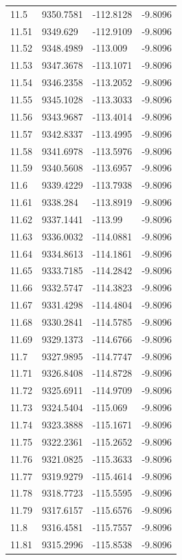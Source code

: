 \begin{table}[H]
\begin{tabular}{llll}
11.5 & 9350.7581 & -112.8128 & -9.8096 \\
11.51 & 9349.629 & -112.9109 & -9.8096 \\
11.52 & 9348.4989 & -113.009 & -9.8096 \\
11.53 & 9347.3678 & -113.1071 & -9.8096 \\
11.54 & 9346.2358 & -113.2052 & -9.8096 \\
11.55 & 9345.1028 & -113.3033 & -9.8096 \\
11.56 & 9343.9687 & -113.4014 & -9.8096 \\
11.57 & 9342.8337 & -113.4995 & -9.8096 \\
11.58 & 9341.6978 & -113.5976 & -9.8096 \\
11.59 & 9340.5608 & -113.6957 & -9.8096 \\
11.6 & 9339.4229 & -113.7938 & -9.8096 \\
11.61 & 9338.284 & -113.8919 & -9.8096 \\
11.62 & 9337.1441 & -113.99 & -9.8096 \\
11.63 & 9336.0032 & -114.0881 & -9.8096 \\
11.64 & 9334.8613 & -114.1861 & -9.8096 \\
11.65 & 9333.7185 & -114.2842 & -9.8096 \\
11.66 & 9332.5747 & -114.3823 & -9.8096 \\
11.67 & 9331.4298 & -114.4804 & -9.8096 \\
11.68 & 9330.2841 & -114.5785 & -9.8096 \\
11.69 & 9329.1373 & -114.6766 & -9.8096 \\
11.7 & 9327.9895 & -114.7747 & -9.8096 \\
11.71 & 9326.8408 & -114.8728 & -9.8096 \\
11.72 & 9325.6911 & -114.9709 & -9.8096 \\
11.73 & 9324.5404 & -115.069 & -9.8096 \\
11.74 & 9323.3888 & -115.1671 & -9.8096 \\
11.75 & 9322.2361 & -115.2652 & -9.8096 \\
11.76 & 9321.0825 & -115.3633 & -9.8096 \\
11.77 & 9319.9279 & -115.4614 & -9.8096 \\
11.78 & 9318.7723 & -115.5595 & -9.8096 \\
11.79 & 9317.6157 & -115.6576 & -9.8096 \\
11.8 & 9316.4581 & -115.7557 & -9.8096 \\
11.81 & 9315.2996 & -115.8538 & -9.8096 \\

\end{tabular}
\end{table}

